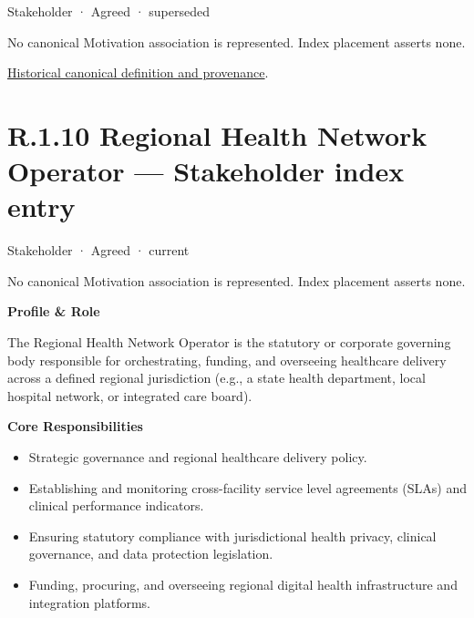 \label{element:c20aa17ce4aa4a58be5eb3cff2ecdd1d}
{\small Stakeholder · Agreed · superseded}\par
No canonical Motivation association is represented. Index placement asserts none.\par
\href{../../../../continuum/motivation/stakeholder/c20aa17ce4aa4a58be5eb3cff2ecdd1d.md}{Historical canonical definition and provenance}.\par
\section*{R.1.10 Regional Health Network Operator — Stakeholder index entry}
\label{navigation:R.1.10}

\label{element:e76216c494fa4500bb80eda6f83513c1}
{\small Stakeholder · Agreed · current}\par
No canonical Motivation association is represented. Index placement asserts none.\par

\par\medskip\textbf{Profile \& Role}\par


The Regional Health Network Operator is the statutory or corporate governing body responsible for orchestrating, funding, and overseeing healthcare delivery across a defined regional jurisdiction (e.g., a state health department, local hospital network, or integrated care board).



\par\medskip\textbf{Core Responsibilities}\par


\begin{itemize}


\item Strategic governance and regional healthcare delivery policy.

\item Establishing and monitoring cross-facility service level agreements (SLAs) and clinical performance indicators.

\item Ensuring statutory compliance with jurisdictional health privacy, clinical governance, and data protection legislation.

\item Funding, procuring, and overseeing regional digital health infrastructure and integration platforms.

\end{itemize}


